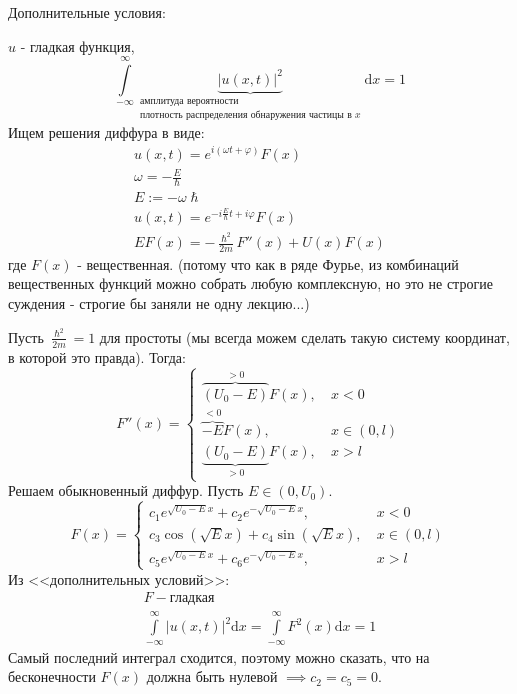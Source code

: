 Дополнительные условия:

$u$ - гладкая функция,
\[
\int\limits_{-\infty}^\infty \underbrace{\left| u(x, t)\right|^2}_{\substack{\text{амплитуда вероятности} \\ \text{плотность распределения обнаружения частицы в }x}} \mathrm{d}x = 1
\]
Ищем решения диффура в виде:
\[
	\begin{aligned}
	u(x,t) = e^{i\left( \omega t + \varphi\right)} F(x) \\
	\omega = -\frac{E}{\hslash} \\
	E := -\omega \hslash \\
	u(x,t) = e ^{-i\frac{E}{\hslash} t + i \varphi} F(x) \\
	EF(x) = -\frac{\hslash^2}{2m} F''(x) + U(x) F(x)
	\end{aligned}
\]
где $F(x)$ - вещественная. (потому что как в ряде Фурье, из комбинаций вещественных функций можно собрать любую комплексную, но это не строгие суждения - строгие бы заняли не одну лекцию...)

Пусть $\frac{\hslash^2}{2m} = 1$ для простоты (мы всегда можем сделать такую систему координат, в которой это правда). Тогда:
\[
	F''(x) = \left\{ \begin{aligned}
			\overbrace{\left(U_0 - E\right)}^{>0} F(x), ~& x < 0 \\
			\overbrace{-E}^{<0}F(x), ~& x \in (0, l) \\
			\underbrace{\left(U_0 - E\right)}_{>0}F(x), ~& x > l
	\end{aligned}\right.
\]
Решаем обыкновенный диффур. Пусть $E \in (0, U_0)$.
\[
	F(x) = \left\{ \begin{aligned}
			c_1 e^{\sqrt{U_0-E} x} + c_2 e^{-\sqrt{U_0-E}x}, ~& x < 0 \\
			c_3 \cos \left( \sqrt{E}x\right) + c_4 \sin \left( \sqrt{E} x\right), ~& x \in (0, l) \\
			c_5 e^{\sqrt{U_0-E}x} + c_6 e^{-\sqrt{U_0-E}x}, ~& x > l
	\end{aligned}\right.
\]
Из <<дополнительных условий>>:
\[
	\begin{aligned}
		F - \text{гладкая} \\
		\int\limits_{-\infty}^{\infty} \left| u(x,t)\right|^2 \mathrm{d}x = \int\limits_{-\infty}^{\infty} F^2(x)\mathrm{d}x = 1
	\end{aligned}
\]
Самый последний интеграл сходится, поэтому можно сказать, что на бесконечности $F(x)$ должна быть нулевой $\implies c_2=c_5=0$.

